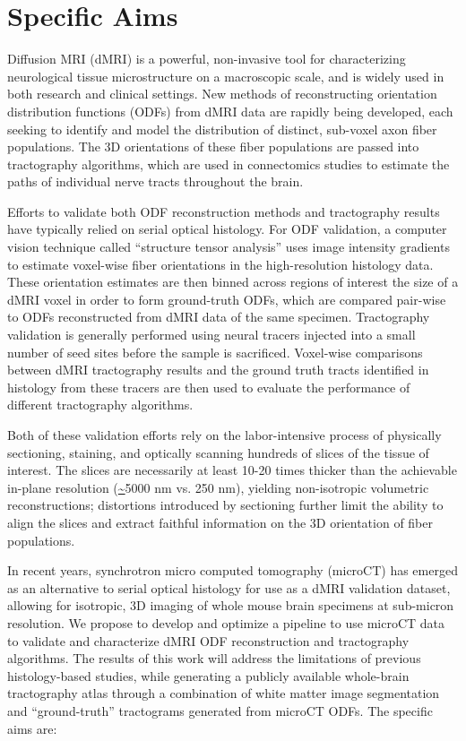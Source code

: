 \documentclass[11pt]{article}
\begin{document}
\section*{Specific Aims}
Diffusion MRI (dMRI) is a powerful, non-invasive tool for characterizing
neurological tissue microstructure on a macroscopic scale, and is widely used in
both research and clinical settings. New methods of reconstructing orientation
distribution functions (ODFs) from dMRI data are rapidly being developed, each
seeking to identify and model the distribution of distinct, sub-voxel axon fiber
populations. The 3D orientations of these fiber populations are passed into
tractography algorithms, which are used in connectomics studies to estimate the
paths of individual nerve tracts throughout the brain.

Efforts to validate both ODF reconstruction methods and tractography results
have typically relied on serial optical histology. For ODF validation, a
computer vision technique called ``structure tensor analysis'' uses image
intensity gradients to estimate voxel-wise fiber orientations in the
high-resolution histology data. These orientation estimates are then binned
across regions of interest the size of a dMRI voxel in order to form
ground-truth ODFs, which are compared pair-wise to ODFs reconstructed from dMRI
data of the same specimen. Tractography validation is generally performed using
neural tracers injected into a small number of seed sites before the sample is
sacrificed. Voxel-wise comparisons between dMRI tractography results and the
ground truth tracts identified in histology from these tracers are then used to
evaluate the performance of different tractography algorithms.

Both of these validation efforts rely on the labor-intensive process of
physically sectioning, staining, and optically scanning hundreds of slices of
the tissue of interest. The slices are necessarily at least 10-20 times thicker
than the achievable in-plane resolution (\url{~}5000 nm vs. 250 nm), yielding
non-isotropic volumetric reconstructions; distortions introduced by sectioning
further limit the ability to align the slices and extract faithful information
on the 3D orientation of fiber populations.

In recent years, synchrotron micro computed tomography (microCT) has emerged as
an alternative to serial optical histology for use as a dMRI validation dataset,
allowing for isotropic, 3D imaging of whole mouse brain specimens at sub-micron
resolution. We propose to develop and optimize a pipeline to use microCT data to
validate and characterize dMRI ODF reconstruction and tractography
algorithms. The results of this work will address the limitations of previous
histology-based studies, while generating a publicly available whole-brain
tractography atlas through a combination of white matter image segmentation and
``ground-truth'' tractograms generated from microCT ODFs. The specific aims are:
\end{document}
